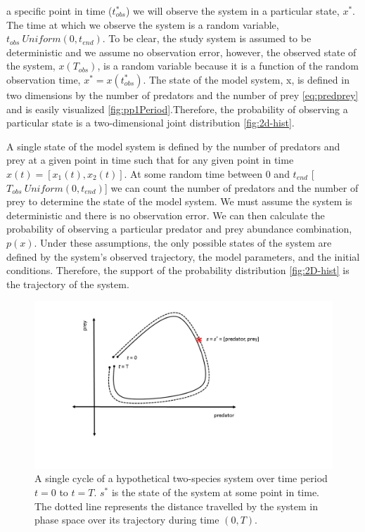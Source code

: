 \documentclass[12pt,twoside,openany]{reedthesis}
\begin{document}
a specific point in time (\(t_{obs}^*\)) we will observe the system in a
particular state, \(x^*\). The time at which we observe the system is a
random variable, \(t_{obs} ~ Uniform(0,t_{end})\). To be clear, the
study system is assumed to be deterministic and we assume no observation
error, however, the observed state of the system, \(x(T_{obs})\), is a
random variable because it is a function of the random observation time,
\(x^*= x(t_{obs}^*)\). The state of the model system, x, is defined in
two dimensions by the number of predators and the number of prey
\eqref{eq:predprey} and is easily visualized
\ref{fig:pp1Period}.Therefore, the probability of observing a particular
state is a two-dimensional joint distribution \ref{fig:2d-hist}.

A single state of the model system is defined by the number of predators
and prey at a given point in time such that for any given point in time
\(x(t)=[x_1 (t),x_2 (t)]\). At some random time between 0 and
\(t_{end}\) {[}\(T_{obs} ~ Uniform(0,t_{end})\){]} we can count the
number of predators and the number of prey to determine the state of the
model system. We must assume the system is deterministic and there is no
observation error. We can then calculate the probability of observing a
particular predator and prey abundance combination, \(p(x)\). Under
these assumptions, the only possible states of the system are defined by
the system's observed trajectory, the model parameters, and the initial
conditions. Therefore, the support of the probability distribution
\ref{fig:2D-hist} is the trajectory of the system.
\begin{figure}

{\centering \includegraphics[width=0.95\linewidth]{./chapterFiles/fiGuide/figures/stringFig} 

}

\caption{A single cycle of a hypothetical two-species system over time period $t = 0$ to $t = T$. $s^*$ is the state of the system at some point in time. The dotted line represents the distance travelled by the system in phase space over its trajectory during time $(0, T)$.}\label{fig:stringFig}
\end{figure}
\end{document}
